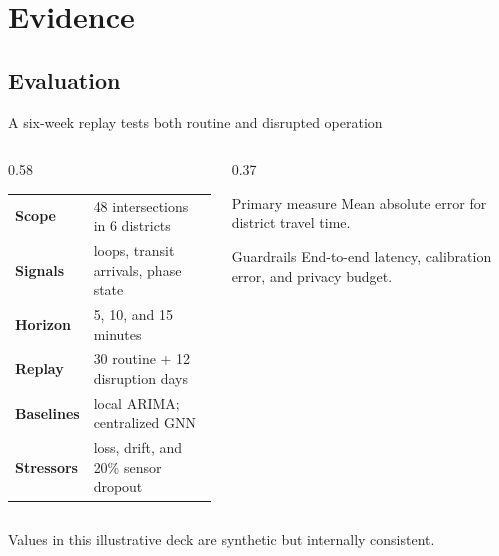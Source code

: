 \section{Evidence}
\subsection{Evaluation}

\begin{frame}{A six-week replay tests both routine and disrupted operation}
  \begin{columns}[T,onlytextwidth]
    \begin{column}{0.58\textwidth}
      \begin{table}
        \centering
        \small
        \begin{tabular}{@{}>{\bfseries}l l@{}}
          \toprule
          Scope & 48 intersections in 6 districts \\
          Signals & loops, transit arrivals, phase state \\
          Horizon & 5, 10, and 15 minutes \\
          Replay & 30 routine + 12 disruption days \\
          Baselines & local ARIMA; centralized GNN \\
          Stressors & loss, drift, and 20\% sensor dropout \\
          \bottomrule
        \end{tabular}
      \end{table}
    \end{column}
    \begin{column}{0.37\textwidth}
      \begin{block}{Primary measure}
        Mean absolute error for district travel time.
      \end{block}
      \begin{exampleblock}{Guardrails}
        End-to-end latency, calibration error, and privacy budget.
      \end{exampleblock}
    \end{column}
  \end{columns}
  \vfill
  \footnotesize\color{PulseInk!80}
  Values in this illustrative deck are synthetic but internally consistent.
\end{frame}

